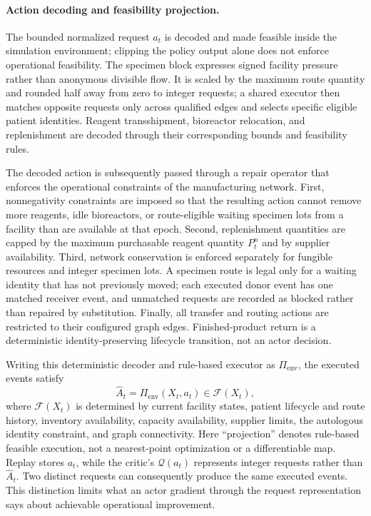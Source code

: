 \documentclass[preprint,review,12pt]{elsarticle}
\begin{document}
\paragraph{Action decoding and feasibility projection.}
The bounded normalized request $a_t$ is decoded and made feasible inside the simulation environment; clipping the policy output alone does not enforce operational feasibility. The specimen block expresses signed facility pressure rather than anonymous divisible flow. It is scaled by the maximum route quantity and rounded half away from zero to integer requests; a shared executor then matches opposite requests only across qualified edges and selects specific eligible patient identities. Reagent transshipment, bioreactor relocation, and replenishment are decoded through their corresponding bounds and feasibility rules.

The decoded action is subsequently passed through a repair operator that enforces the operational constraints of the manufacturing network. First, nonnegativity constraints are imposed so that the resulting action cannot remove more reagents, idle bioreactors, or route-eligible waiting specimen lots from a facility than are available at that epoch. Second, replenishment quantities are capped by the maximum purchasable reagent quantity $P_t^n$ and by supplier availability. Third, network conservation is enforced separately for fungible resources and integer specimen lots. A specimen route is legal only for a waiting identity that has not previously moved; each executed donor event has one matched receiver event, and unmatched requests are recorded as blocked rather than repaired by substitution. Finally, all transfer and routing actions are restricted to their configured graph edges. Finished-product return is a deterministic identity-preserving lifecycle transition, not an actor decision.

Writing this deterministic decoder and rule-based executor as $\Pi_{\mathrm{env}}$, the executed events satisfy
\begin{equation}
\hat{A}_t = \Pi_{\mathrm{env}}(X_t,a_t)\in\mathcal{F}(X_t),
\end{equation}
where $\mathcal{F}(X_t)$ is determined by current facility states, patient lifecycle and route history, inventory availability, capacity availability, supplier limits, the autologous identity constraint, and graph connectivity. Here ``projection'' denotes rule-based feasible execution, not a nearest-point optimization or a differentiable map. Replay stores $a_t$, while the critic's $\mathcal{Q}(a_t)$ represents integer requests rather than $\hat{A}_t$. Two distinct requests can consequently produce the same executed events. This distinction limits what an actor gradient through the request representation says about achievable operational improvement.
\end{document}
